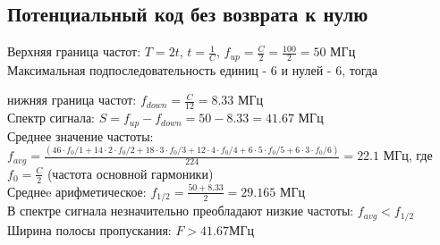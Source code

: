 \documentclass{article}
\begin{document}
\subsection{Потенциальный код без возврата к нулю}
Верхняя граница частот: $T=2t$, $t=\frac{1}{C}$, $f_{up} = \frac{C}{2} = \frac{100}{2} = 50$ МГц
\\
Максимальная подпоследовательность единиц - 6 и нулей - 6, тогда

нижняя граница частот: $f_{down} = \frac{C}{12} = 8.33$ МГц
\\
Спектр сигнала: $S = f_{up} - f_{down} = 50 - 8.33 = 41.67$ МГц
\\
Среднее значение частоты: $f_{avg} = \frac{(46 \cdot f_0/1 + 14 \cdot 2 \cdot f_0/2 + 18 \cdot 3 \cdot f_0/3 + 12 \cdot 4 \cdot f_0/4 + 6 \cdot 5 \cdot f_0/5 + 6 \cdot 3 \cdot f_0/6)}{224} =22.1$ МГц, где $f_0 = \frac{C}{2}$ (частота основной гармоники)
\\
Среднеe арифметическое: $f_{1/2} = \frac{50 + 8.33}{2} = 29.165$ МГц
\\
В спектре сигнала незначительно преобладают низкие частоты: $f_{avg} < f_{1/2}$
\\
Ширина полосы пропускания: $F > 41.67 $МГц

\begin{center}
\end{center}
\end{document}
